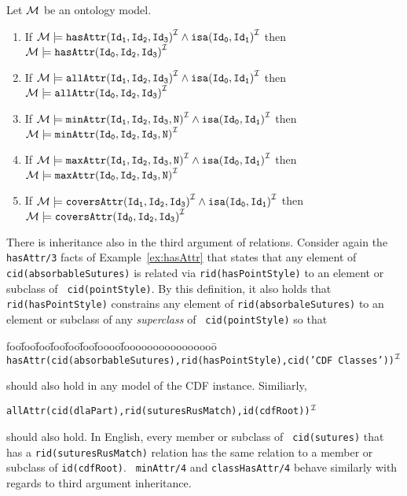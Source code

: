 \begin{proposition} \label{prop:inh1}\rm
Let ${\cal M}$ be an ontology model.
\begin{enumerate}
\item If ${\cal M} \models {\tt hasAttr(Id_1,Id_2,Id_3)}^{{\cal I}} \wedge
						{\tt isa(Id_0,Id_1)}^{{\cal I}}$ 
	then ${\cal M} \models  {\tt hasAttr(Id_0,Id_2,Id_3)}^{{\cal I}}$
%
\item If ${\cal M} \models {\tt allAttr(Id_1,Id_2,Id_3)}^{{\cal I}} \wedge
					    {\tt isa(Id_0,Id_1)}^{{\cal I}}$ 
		then ${\cal M} \models {\tt allAttr(Id_0,Id_2,Id_3)}^{{\cal I}}$ 
\item If ${\cal M} \models {\tt minAttr(Id_1,Id_2,Id_3,N)}^{{\cal I}} \wedge
						{\tt isa(Id_0,Id_1)}^{{\cal I}}$ 
	then ${\cal M} \models  {\tt minAttr(Id_0,Id_2,Id_3,N)}^{{\cal I}}$
%
\item If ${\cal M} \models {\tt maxAttr(Id_1,Id_2,Id_3,N)}^{{\cal I}} \wedge
					    {\tt isa(Id_0,Id_1)}^{{\cal I}}$ 
		then ${\cal M} \models {\tt maxAttr(Id_0,Id_2,Id_3,N)}^{{\cal I}}$ 
%
\item If ${\cal M} \models {\tt coversAttr(Id_1,Id_2,Id_3)}^{{\cal I}} \wedge
					    {\tt isa(Id_0,Id_1)}^{{\cal I}}$ 
		then ${\cal M} \models {\tt coversAttr(Id_0,Id_2,Id_3)}^{{\cal I}}$ 
%
\end{enumerate}
\end{proposition}



There is inheritance also in the third argument of relations.
Consider again the {\tt hasAttr/3} facts of Example~\ref{ex:hasAttr}
that states that any element of {\tt cid(absorbableSutures)} is
related via {\tt rid(hasPointStyle)} to an element or subclass of {\tt
cid(pointStyle)}.  By this definition, it also holds that {\tt
rid(hasPointStyle)} constrains any element of {\tt rid(absorbaleSutures)}
to an element or subclass of any {\em superclass} of {\tt
cid(pointStyle)} so that
{\small 
\begin{tabbing}
foo\=foo\=foo\=foo\=foo\=foo\=foooo\=foooooooooooooooo\=\kill
\> 
{\tt hasAttr(cid(absorbableSutures),rid(hasPointStyle),cid('CDF Classes'))}$^{{\cal I}}$
\end{tabbing} }
\noindent
should also hold in any model of the CDF instance.  
Similiarly,

{\tt allAttr(cid(dlaPart),rid(suturesRusMatch),id(cdfRoot))$^{{\cal I}}$}

\noindent
should also hold.  In English, every member or subclass of {\tt
cid(sutures)} that has a {\tt rid(suturesRusMatch)} relation has the
same relation to a member or subclass of {\tt id(cdfRoot)}.  {\tt
minAttr/4} and {\tt classHasAttr/4} behave similarly with regards to
third argument inheritance.

